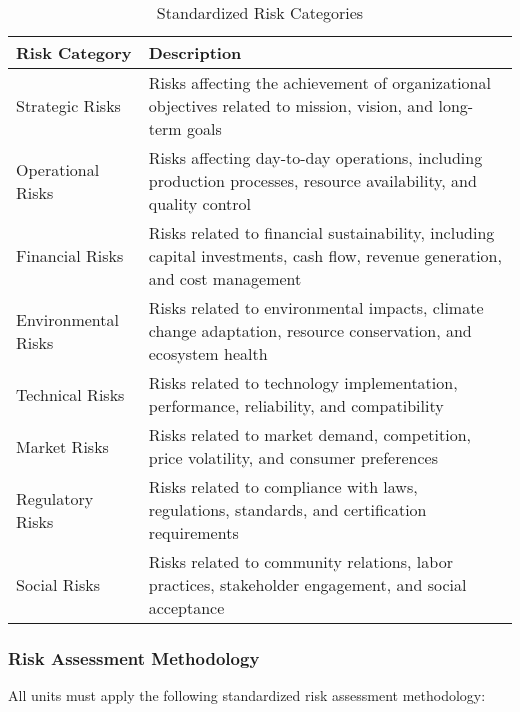 \begin{table}[h]
\centering
\begin{tabular}{|p{3cm}|p{9cm}|}
\hline
\textbf{Risk Category} & \textbf{Description} \\
\hline
Strategic Risks & Risks affecting the achievement of organizational objectives related to mission, vision, and long-term goals \\
\hline
Operational Risks & Risks affecting day-to-day operations, including production processes, resource availability, and quality control \\
\hline
Financial Risks & Risks related to financial sustainability, including capital investments, cash flow, revenue generation, and cost management \\
\hline
Environmental Risks & Risks related to environmental impacts, climate change adaptation, resource conservation, and ecosystem health \\
\hline
Technical Risks & Risks related to technology implementation, performance, reliability, and compatibility \\
\hline
Market Risks & Risks related to market demand, competition, price volatility, and consumer preferences \\
\hline
Regulatory Risks & Risks related to compliance with laws, regulations, standards, and certification requirements \\
\hline
Social Risks & Risks related to community relations, labor practices, stakeholder engagement, and social acceptance \\
\hline
\end{tabular}
\caption{Standardized Risk Categories}
\end{table}

\subsubsection{Risk Assessment Methodology} \label{sec:risk_assessment_methodology}

All units must apply the following standardized risk assessment methodology:

